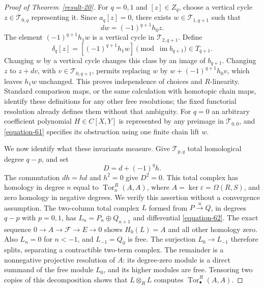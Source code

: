 \documentclass[11pt,a4paper]{article}
\theoremstyle{definition}
\begin{document}
\begin{proof}[Proof of Theorem~\ref{result-20}]
For $q=0,1$ and $[z]\in Z_q$, choose a vertical cycle
$z\in\mathcal T_{0,q}$ representing it. Since $a_q[z]=0$,
there exists $w\in\mathcal T_{1,q+1}$ such that
\[
                dw=(-1)^{q+1}h_0z.
\]
The element $(-1)^{q+1}h_1w$ is a vertical cycle in
$\mathcal T_{2,q+1}$. Define
\begin{equation}
        \delta_q[z]=[(-1)^{q+1}h_1w]
                  \pmod{\operatorname{im}b_{q+1}}\in T_{q+1}.
                                                        \label{equation-61}
\end{equation}
Changing $w$ by a vertical cycle changes this class by an image of
$b_{q+1}$. Changing $z$ to $z+dv$, with
$v\in\mathcal T_{0,q+1}$, permits replacing $w$ by
$w+(-1)^{q+1}h_0v$, which leaves $h_1w$ unchanged.
This proves independence of choices and $R$-linearity. Standard
comparison maps, or the same calculation with homotopic chain maps,
identify these definitions for any other free resolutions; the fixed
functorial resolution already defines them without that ambiguity.
For $q=0$ an arbitrary coefficient polynomial $H\in C[X,Y]$ is
represented by any preimage in $\mathcal T_{0,0}$, and \eqref{equation-61}
specifies its obstruction using one finite chain lift $w$.

We now identify what these invariants measure. Give
$\mathcal T_{p,q}$ total homological degree $q-p$, and set
\begin{equation}
                      D=d+(-1)^q h.                     \label{equation-62}
\end{equation}
The commutation $dh=hd$ and $h^2=0$ give $D^2=0$.
This total complex has homology in degree $n$ equal to
$\operatorname{Tor}_n^R(A,A)$, where $A=\ker\varepsilon=\Omega(R,S)$,
and zero homology in negative degrees. We verify this assertion
without a convergence assumption. The two-column total complex
$L$ formed from $P\xrightarrow{u}Q$, in degrees $q-p$ with
$p=0,1$, has $L_n=P_n\oplus Q_{n+1}$ and differential \eqref{equation-62}.
The exact sequence $0\to A\to\mathcal F\to E\to0$ shows
$H_0(L)=A$ and all other homology zero. Also $L_n=0$ for $n<-1$,
and $L_{-1}=Q_0$ is free. The surjection $L_0\to L_{-1}$ therefore
splits, separating a contractible two-term complex. The remainder
is a nonnegative projective resolution of $A$: its degree-zero
module is a direct summand of the free module $L_0$, and its
higher modules are free. Tensoring two copies of this decomposition
shows that $L\otimes_RL$ computes $\operatorname{Tor}_\bullet^R(A,A)$.


\end{proof}
\end{document}
